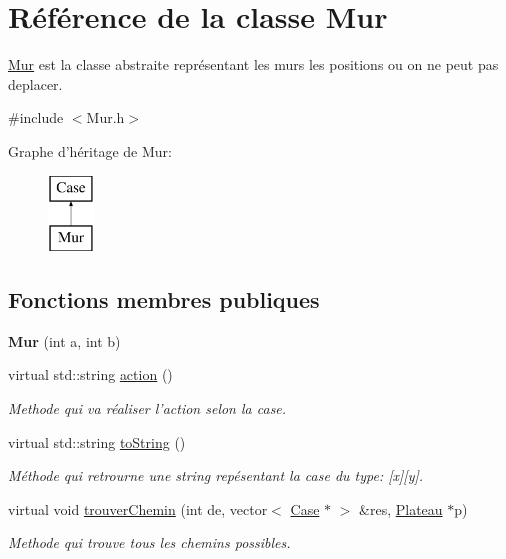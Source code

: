 \hypertarget{classMur}{\section{\-Référence de la classe \-Mur}
\label{classMur}
}


\hyperlink{classMur}{\-Mur} est la classe abstraite représentant les murs les positions ou on ne peut pas deplacer.  




{\ttfamily \#include $<$\-Mur.\-h$>$}

\-Graphe d'héritage de \-Mur\-:\begin{figure}[H]
\begin{center}
\leavevmode
\includegraphics[height=2.000000cm]{classMur}
\end{center}
\end{figure}
\subsection*{\-Fonctions membres publiques}
\begin{DoxyCompactItemize}
\item 
\hypertarget{classMur_a3e7b1afaccb62ba5fa7cc8e1728e7dff}{{\bfseries \-Mur} (int a, int b)}\label{classMur_a3e7b1afaccb62ba5fa7cc8e1728e7dff}

\item 
\hypertarget{classMur_a0fda0e8825c34a5f06d651e263bff058}{virtual std\-::string \hyperlink{classMur_a0fda0e8825c34a5f06d651e263bff058}{action} ()}\label{classMur_a0fda0e8825c34a5f06d651e263bff058}

\begin{DoxyCompactList}\small\item\em \-Methode qui va réaliser l'action selon la case. \end{DoxyCompactList}\item 
virtual std\-::string \hyperlink{classMur_a8d319947a0158801579dc5f1f8568281}{to\-String} ()
\begin{DoxyCompactList}\small\item\em \-Méthode qui retrourne une string repésentant la case du type\-: \mbox{[}x\mbox{]}\mbox{[}y\mbox{]}. \end{DoxyCompactList}\item 
virtual void \hyperlink{classMur_a83a304537e5863c25ce60879196d8e6e}{trouver\-Chemin} (int de, vector$<$ \hyperlink{classCase}{\-Case} $\ast$ $>$ \&res, \hyperlink{classPlateau}{\-Plateau} $\ast$p)
\begin{DoxyCompactList}\small\item\em \-Methode qui trouve tous les chemins possibles. \end{DoxyCompactList}\end{DoxyCompactItemize}


